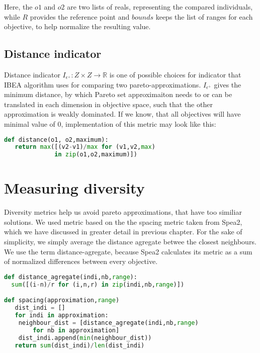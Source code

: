 \documentclass[12pt,oneside]{fithesis2}
\begin{document}
Here, the $o1$ and $o2$ are two lists of reals, representing the compared individuals, while $R$ provides the reference point and $bounds$ keeps the list of ranges for each objective, to help normalize the resulting value.

\subsection{Distance indicator}
Distance indicator $I_{\epsilon^{+}}: Z \times Z \to  \mathbb{R}$ is one of possible choices for indicator that IBEA algorithm uses for comparing two pareto-approximations. $I_{\epsilon^{+}}$ gives the minimum distance, by which Pareto set approximaiton needs to or can be translated in each dimension in objective space, such that the other approximation is weakly dominated. If we know, that all objectives will have minimal value of 0, implementation of this metric may look like this:

\begin{lstlisting}[language=Python,label=eps_example,caption=Distance indicator implementation]
def distance(o1, o2,maximum):
   return max([(v2-v1)/max for (v1,v2,max) 
              in zip(o1,o2,maximum)])
\end{lstlisting}

\section{Measuring diversity}
Diversity metrics help us avoid pareto approximations, that have too similiar solutions. We used metric based on the the spacing metric taken from Spea2, which we have discussed in greater detail in previous chapter. For the sake of simplicity, we simply average the distance agregate betwee the closest neighbours. We use the term distance-agregate, because Spea2 calculates its metric as a sum of normalized differences between every objective.

\begin{lstlisting}[language=Python,label=space_example,caption=Spacing indicator implementation]
def distance_agregate(indi,nb,range):
  sum([(i-n)/r for (i,n,r) in zip(indi,nb,range)])

def spacing(approximation,range)
   dist_indi = []
   for indi in approximation:
	neighbour_dist = [distance_agregate(indi,nb,range) 
		for nb in approximation]
	dist_indi.append(min(neighbour_dist))
   return sum(dist_indi)/len(dist_indi)
\end{lstlisting}
\end{document}
